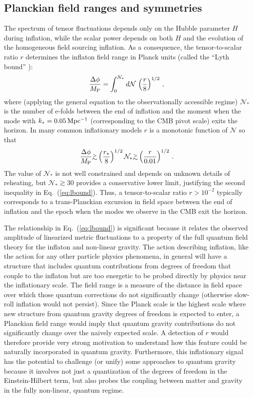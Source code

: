 \subsection{Planckian field ranges and symmetries}
The spectrum of tensor fluctuations depends only on the Hubble parameter $H$ during inflation, while the scalar power depends on both $H$ and the evolution of the homogeneous field sourcing inflation. As a consequence, the tensor-to-scalar ratio $r$ determines the inflaton field range in Planck units (called the ``Lyth bound'' \cite{Lyth:1996im}):
\begin{equation}
\label{eq:Lyth}
\frac{\Delta\phi}{M_{\rm P}}=\int_0^{\mathcal{N}_\ast}d\mathcal{N}\,\left(\frac{r}{8}\right)^{1/2}\,,
\end{equation}
where (applying the general equation to the observationally accessible regime) $\mathcal{N}_\ast$ is the number of e-folds between the end of inflation and the moment when the mode with $k_\ast=0.05\,{\rm Mpc^{-1}}$ (corresponding to the CMB pivot scale) exits the horizon. In many common inflationary models $r$ is a monotonic function of $\mathcal{N}$ so that
\begin{equation}
\label{eq:lbound}
\frac{\Delta\phi}{M_{\rm P}}\gtrsim \left(\frac{r_\ast}{8}\right)^{1/2}\mathcal{N}_\ast\gtrsim \left(\frac{r}{0.01}\right)^{1/2}\,.
\end{equation}  
The value of $\mathcal{N}_\ast$ is not well constrained and depends on unknown details of reheating, but $\mathcal{N}_\ast\gtrsim 30$ provides a conservative lower limit, justifying the second inequality in Eq.~(\ref{eq:lbound}). Thus, a tensor-to-scalar ratio $r>10^{-2}$ typically corresponds to a trans-Planckian excursion in field space between the end of inflation and the epoch when the modes we observe in the CMB exit the horizon.

The relationship in Eq.~(\ref{eq:lbound}) is significant because it relates the observed amplitude of linearized metric fluctuations to a property of the full quantum field theory for the inflaton and non-linear gravity. The action describing inflation, like the action for any other particle physics phenomena, in general will have a structure that includes quantum contributions from degrees of freedom that couple to the inflaton but are too energetic to be probed directly by physics near the inflationary scale. The field range is a measure of the distance in field space over which those quantum corrections do not significantly change (otherwise slow-roll inflation would not persist). Since the Planck scale is the highest scale where new structure from quantum gravity degrees of freedom is expected to enter, a Planckian field range would imply that quantum gravity contributions do not significantly change over the naively expected scale. A detection of $r$ would therefore provide very strong motivation to understand how this feature could be naturally incorporated in quantum gravity. Furthermore, this inflationary signal has the potential to challenge (or unify) some approaches to quantum gravity because it involves not just a quantization of the degrees of freedom in the Einstein-Hilbert term, but also probes the coupling between matter and gravity in the fully non-linear, quantum regime.

